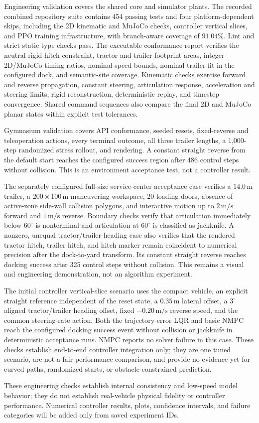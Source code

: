 Engineering validation covers the shared core and simulator plants. The
recorded combined repository suite contains 454 passing tests
and four platform-dependent skips, including the 2D kinematic and MuJoCo
checks, controller vertical slices, and PPO training infrastructure, with
branch-aware coverage of $91.04\%$. Lint and strict
static type checks pass. The executable conformance report verifies
the neutral rigid-hitch constraint, tractor and trailer footprint areas,
integer 2D/MuJoCo timing ratios, nominal speed bounds, nominal trailer fit in
the configured dock, and semantic-site coverage. Kinematic checks exercise
forward and reverse propagation, constant steering, articulation response,
acceleration and steering limits, rigid reconstruction, deterministic replay,
and timestep convergence. Shared command sequences also compare the final 2D
and MuJoCo planar states within explicit test tolerances.

Gymnasium validation covers API conformance, seeded resets, fixed-reverse and
teleoperation actions, every terminal outcome, all three trailer lengths, a
1,000-step randomized stress rollout, and rendering. A constant straight
reverse from the default start reaches the configured success region after 486
control steps without collision. This is an environment acceptance test, not a
controller result.

The separately configured full-size service-center acceptance case verifies a
$14.0\,\mathrm{m}$ trailer, a $200\times100\,\mathrm{m}$ maneuvering workspace,
20 loading doors, absence of active-zone side-wall collision polygons, and
interactive motion up to $2\,\mathrm{m/s}$ forward and $1\,\mathrm{m/s}$
reverse. Boundary checks verify that articulation immediately below $60^\circ$
is nonterminal and articulation at $60^\circ$ is classified as jackknife. A
nonzero, unequal tractor/trailer-heading case also verifies that the rendered
tractor hitch, trailer hitch, and hitch marker remain coincident to numerical
precision after the dock-to-yard transform. Its constant straight reverse
reaches docking success after 325 control steps without collision. This remains
a visual and engineering demonstration, not an algorithm experiment.

The initial controller vertical-slice scenario uses the compact vehicle, an
explicit straight reference independent of the reset state, a $0.35\,\mathrm{m}$
lateral offset, a $3^\circ$ aligned tractor/trailer heading offset, fixed
$-0.20\,\mathrm{m/s}$ reverse speed, and the common steering-rate action. Both
the trajectory-error LQR and basic NMPC reach the configured docking success
event without collision or jackknife in deterministic acceptance runs. NMPC
reports no solver failure in this case. These checks establish end-to-end
controller integration only; they are one tuned scenario, are not a fair
performance comparison, and provide no evidence yet for curved paths,
randomized starts, or obstacle-constrained prediction.

These engineering checks establish internal consistency and low-speed model
behavior; they do not establish real-vehicle physical fidelity or controller
performance.
Numerical controller results, plots, confidence intervals, and failure
categories will be added only from saved experiment IDs.
